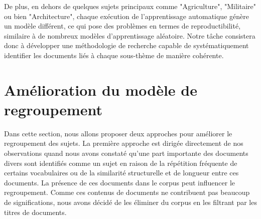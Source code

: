 De plus, en dehors de quelques sujets principaux comme "Agriculture", "Militaire" ou bien "Architecture", chaque exécution de l'apprentissage automatique génère un modèle différent, ce qui pose des problèmes en termes de reproductibilité, similaire à de nombreux modèles d'apprentissage aléatoire. Notre tâche consistera donc à développer une méthodologie de recherche capable de systématiquement identifier les documents liés à chaque sous-thème de manière cohérente.



\clearpage
\newpage

\section{Amélioration du modèle de regroupement}
Dans cette section, nous allons proposer deux approches pour améliorer le regroupement des sujets. La première approche est dirigée directement de nos observations quand nous avons constaté qu'une part importante des documents divers sont identifiés comme un sujet en raison de la répétition fréquente de certains vocabulaires ou de la similarité structurelle et de longueur entre ces documents. La présence de ces documents dans le corpus peut influencer le regroupement. Comme ces contenus de documents ne contribuent pas beaucoup de significations, nous avons décidé de les éliminer du corpus en les filtrant par les titres de documents. 

